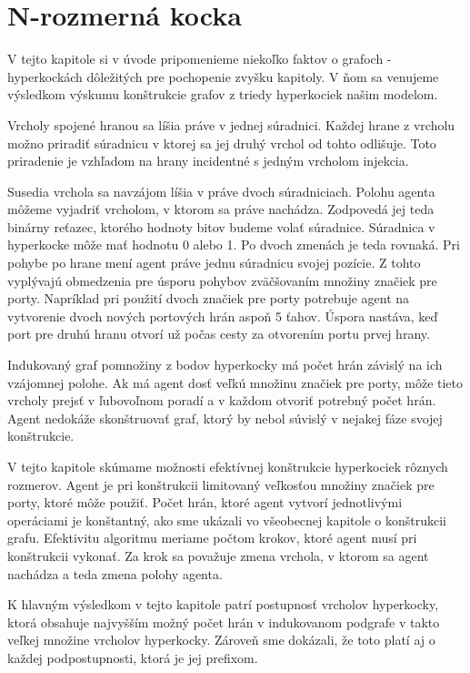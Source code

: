 {}



\chapter{N-rozmerná kocka}
V tejto kapitole si v úvode pripomenieme niekoľko faktov o grafoch - 
hyperkockách dôležitých pre pochopenie zvyšku kapitoly. V ňom sa venujeme
výsledkom výskumu konštrukcie grafov z triedy hyperkociek našim modelom.

Vrcholy spojené hranou sa líšia práve v jednej súradnici. Každej hrane z
vrcholu možno priradiť súradnicu v ktorej sa jej druhý vrchol od tohto
odlišuje. Toto priradenie je vzhľadom na hrany incidentné s jedným vrcholom
 injekcia.

Susedia vrchola sa navzájom líšia v práve dvoch súradniciach. Polohu agenta
môžeme vyjadriť vrcholom, v ktorom sa práve nachádza. Zodpovedá jej teda
binárny reťazec, ktorého hodnoty bitov budeme volať súradnice. Súradnica v
hyperkocke môže mať hodnotu 0 alebo 1. Po dvoch zmenách je teda rovnaká.
 Pri pohybe po hrane mení agent práve jednu súradnicu svojej pozície. 
Z tohto vyplývajú obmedzenia
pre úsporu pohybov zväčšovaním množiny značiek pre porty. 
Napríklad pri použití dvoch
značiek pre porty potrebuje agent na vytvorenie dvoch nových portových hrán
aspoň 5 ťahov. Úspora nastáva, keď port pre druhú hranu otvorí už počas
cesty za otvorením portu prvej hrany.

Indukovaný graf pomnožiny z bodov hyperkocky má počet hrán závislý na ich
vzájomnej polohe. Ak má agent dosť veľkú množinu značiek pre porty, môže
tieto vrcholy prejsť v ľubovoľnom poradí a v každom otvoriť potrebný počet
hrán. Agent nedokáže skonštruovať graf, ktorý by nebol súvislý v nejakej
fáze svojej konštrukcie.

V tejto kapitole skúmame možnosti efektívnej konštrukcie hyperkociek rôznych
rozmerov. Agent je pri konštrukcii limitovaný veľkosťou množiny značiek pre
porty, ktoré môže použiť. Počet hrán, ktoré agent vytvorí jednotlivými
operáciami je konštantný, ako sme ukázali vo všeobecnej kapitole o
konštrukcii grafu. Efektivitu algoritmu meriame počtom krokov, ktoré agent
musí pri konštrukcii vykonať. Za krok sa považuje zmena vrchola, v ktorom sa
agent nachádza a teda zmena polohy agenta.

K hlavným výsledkom v tejto kapitole patrí postupnosť vrcholov hyperkocky, ktorá
obsahuje najvyšším možný počet hrán v indukovanom podgrafe v takto veľkej
množine vrcholov hyperkocky. Zároveň sme dokázali, že toto platí aj o každej
podpostupnosti, ktorá je jej prefixom.

